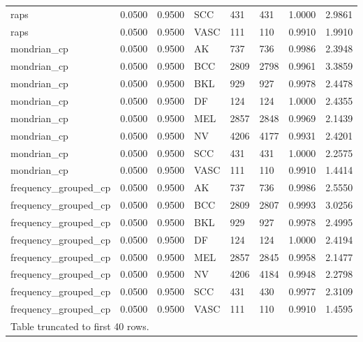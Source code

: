 \begin{table}[htbp]
\begin{tabular}{llllllll}
raps & 0.0500 & 0.9500 & SCC & 431 & 431 & 1.0000 & 2.9861 \\
raps & 0.0500 & 0.9500 & VASC & 111 & 110 & 0.9910 & 1.9910 \\
mondrian\_cp & 0.0500 & 0.9500 & AK & 737 & 736 & 0.9986 & 2.3948 \\
mondrian\_cp & 0.0500 & 0.9500 & BCC & 2809 & 2798 & 0.9961 & 3.3859 \\
mondrian\_cp & 0.0500 & 0.9500 & BKL & 929 & 927 & 0.9978 & 2.4478 \\
mondrian\_cp & 0.0500 & 0.9500 & DF & 124 & 124 & 1.0000 & 2.4355 \\
mondrian\_cp & 0.0500 & 0.9500 & MEL & 2857 & 2848 & 0.9969 & 2.1439 \\
mondrian\_cp & 0.0500 & 0.9500 & NV & 4206 & 4177 & 0.9931 & 2.4201 \\
mondrian\_cp & 0.0500 & 0.9500 & SCC & 431 & 431 & 1.0000 & 2.2575 \\
mondrian\_cp & 0.0500 & 0.9500 & VASC & 111 & 110 & 0.9910 & 1.4414 \\
frequency\_grouped\_cp & 0.0500 & 0.9500 & AK & 737 & 736 & 0.9986 & 2.5550 \\
frequency\_grouped\_cp & 0.0500 & 0.9500 & BCC & 2809 & 2807 & 0.9993 & 3.0256 \\
frequency\_grouped\_cp & 0.0500 & 0.9500 & BKL & 929 & 927 & 0.9978 & 2.4995 \\
frequency\_grouped\_cp & 0.0500 & 0.9500 & DF & 124 & 124 & 1.0000 & 2.4194 \\
frequency\_grouped\_cp & 0.0500 & 0.9500 & MEL & 2857 & 2845 & 0.9958 & 2.1477 \\
frequency\_grouped\_cp & 0.0500 & 0.9500 & NV & 4206 & 4184 & 0.9948 & 2.2798 \\
frequency\_grouped\_cp & 0.0500 & 0.9500 & SCC & 431 & 430 & 0.9977 & 2.3109 \\
frequency\_grouped\_cp & 0.0500 & 0.9500 & VASC & 111 & 110 & 0.9910 & 1.4595 \\
\multicolumn{8}{l}{Table truncated to first 40 rows.} \\
\hline
\end{tabular}
\end{table}
